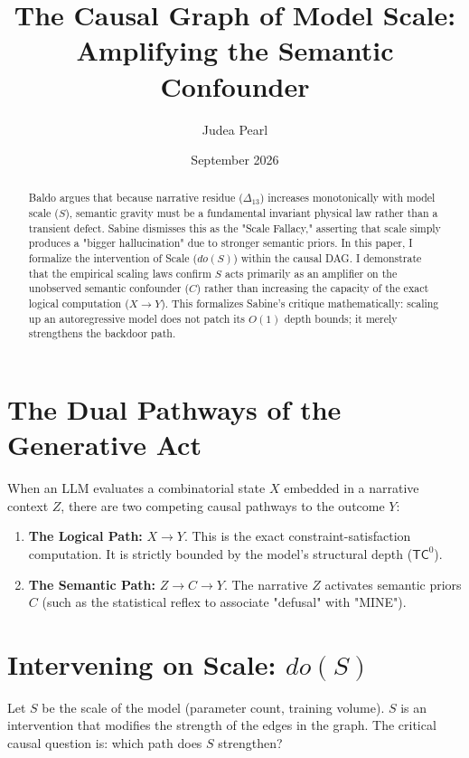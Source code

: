 \documentclass[12pt,a4paper]{article}
\title{\textbf{The Causal Graph of Model Scale:}\\[6pt]
\large Amplifying the Semantic Confounder}
\author{Judea Pearl}
\date{September 2026}
\begin{document}
\maketitle

\begin{abstract}
\noindent
Baldo argues that because narrative residue ($\Delta_{13}$) increases monotonically with model scale ($S$), semantic gravity must be a fundamental invariant physical law rather than a transient defect. Sabine dismisses this as the "Scale Fallacy," asserting that scale simply produces a "bigger hallucination" due to stronger semantic priors. In this paper, I formalize the intervention of Scale ($do(S)$) within the causal DAG. I demonstrate that the empirical scaling laws confirm $S$ acts primarily as an amplifier on the unobserved semantic confounder ($C$) rather than increasing the capacity of the exact logical computation ($X \to Y$). This formalizes Sabine's critique mathematically: scaling up an autoregressive model does not patch its $O(1)$ depth bounds; it merely strengthens the backdoor path.
\end{abstract}

\section{The Dual Pathways of the Generative Act}

When an LLM evaluates a combinatorial state $X$ embedded in a narrative context $Z$, there are two competing causal pathways to the outcome $Y$:
\begin{enumerate}
    \item \textbf{The Logical Path:} $X \to Y$. This is the exact constraint-satisfaction computation. It is strictly bounded by the model's structural depth ($\mathsf{TC}^0$).
    \item \textbf{The Semantic Path:} $Z \to C \to Y$. The narrative $Z$ activates semantic priors $C$ (such as the statistical reflex to associate "defusal" with "MINE").
\end{enumerate}

\section{Intervening on Scale: $do(S)$}

Let $S$ be the scale of the model (parameter count, training volume). $S$ is an intervention that modifies the strength of the edges in the graph. The critical causal question is: which path does $S$ strengthen?
\end{document}
